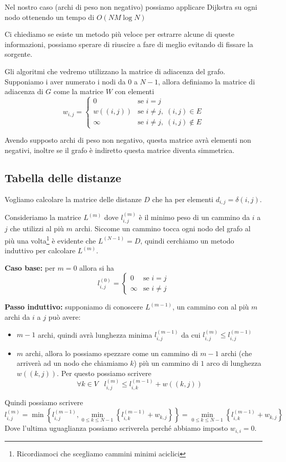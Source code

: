 \documentclass[a4paper,10pt]{amsbook}
\theoremstyle{plain}
\theoremstyle{definition}
\theoremstyle{remark}
\newcommand{\set}[1]{\left\{#1\right\}}
\newcommand{\pa}[1]{\left(#1\right)}
\begin{document}
Nel nostro caso (archi di peso non negativo) possiamo applicare
Dijkstra su ogni nodo ottenendo un tempo di $O(NM\log N)$

Ci chiediamo se esiste un metodo più veloce per estrarre alcune di
queste informazioni, possiamo sperare di riuscire a fare di meglio
evitando di fissare la sorgente.

Gli algoritmi che vedremo utilizzano la matrice di adiacenza del
grafo. Supponiamo i aver numerato i nodi da $0$ a $N-1$, allora
definiamo la matrice di adiacenza di $G$ come la matrice $W$ con
elementi
\[
  w_{i,j} = \left\{
    \begin{matrix}
      0 & \text{se } i = j \\
      w\pa{(i,j)} & \text{se } i\neq j,\; (i,j) \in E \\
      \infty & \text{se } i\neq j,\; (i,j) \not\in E
    \end{matrix}
  \right.
\]

Avendo supposto archi di peso non negativo, questa matrice avrà
elementi non negativi, inoltre se il grafo è indiretto questa matrice
diventa simmetrica.

\subsection{Tabella delle distanze}

Vogliamo calcolare la matrice delle distanze $D$ che ha per elementi
$d_{i,j} = \delta(i,j)$.

Consideriamo la matrice $L^{(m)}$ dove $l^{(m)}_{i,j}$ è il minimo
peso di un cammino da $i$ a $j$ che utilizzi al più $m$ archi. Siccome
un cammino tocca ogni nodo del grafo al pi\`u una
volta\footnote{Ricordiamoci che scegliamo cammini minimi aciclici} \`e
evidente che $L^{(N-1)} = D$, quindi cerchiamo un metodo induttivo per
calcolare $L^{(m)}$.

\textbf{Caso base:} per $m=0$ allora si ha
\[ l^{(0)} _{i,j} = \left\{
  \begin{matrix}
    0 & \text{se } i = j\\
    \infty & \text{se } i \neq j
  \end{matrix}
  \right.
\]

\textbf{Passo induttivo:} supponiamo di conoscere $L^{(m-1)}$, un
cammino con al più $m$ archi da $i$ a $j$ può avere:
\begin{itemize}
\item $m-1$ archi, quindi avrà lunghezza minima $l^{(m-1)}
  _{i,j}$ da cui $l^{(m)}_{i,j} \le l^{(m-1)} _{i,j}$
\item $m$ archi, allora lo possiamo spezzare come un cammino di
  $m-1$ archi (che arriverà ad un nodo che chiamiamo $k$) più un
  cammino di $1$ arco di lunghezza $w\pa{(k,j)}$. Per questo possiamo
  scrivere 
  \[ \forall k \in V\;\;\; l^{(m)}_{i,j} \le l^{(m-1)} _{i,k} + w\pa{
    (k,j) } \]
\end{itemize}
Quindi possiamo scrivere
\[ l^{(m)}_{i,j} = \min\set{ l^{(m-1)} _{i,j} , \min _{0\le k\le N-1}
  \set{ l^{(m-1)} _{i,k} + w_{k,j}} }  =  \min _{0\le k\le N-1}
  \set{ l^{(m-1)} _{i,k} + w_{k,j}} \]
Dove l'ultima uguaglianza possiamo scriverela perché abbiamo imposto
$w_{i,i} = 0$.
\end{document}
